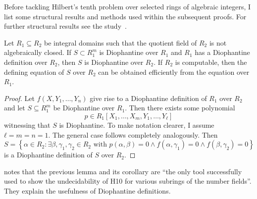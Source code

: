 %

Before tackling Hilbert's tenth problem over selected rings of algebraic
integers, I list some structural results and methods used within the subsequent
proofs. For further structural results see the study~\cite{Shlapentokh2000}.

\begin{lem}\label{lem:moving up}
Let \(R_1 \subseteq R_2\) be integral domains such that the quotient field of
\(R_2\) is not algebraically closed. If \(S ⊂ R_1^m\) is Diophantine over
\(R_1\) and \(R_1\) has a Diophantine definition over \(R_2\), then \(S\) is
Diophantine over \(R_2\). If \(R_2\) is computable, then the defining equation
of \(S\) over \(R_2\) can be obtained efficiently from the equation over
\(R_1\).
\end{lem}
\begin{proof}
  Let \(f(X, Y_1, …, Y_n)\) give rise to a Diophantine definition of \(R_1\)
  over \(R_2\) and let \(S \subseteq R_1^m\) be Diophantine over \(R_1\). Then
  there exists some polynomial
  \[
    p ∈ R_1[X_1, …, X_m, Y_1, …, Y_ℓ]
  \]
  witnessing that \(S\) is Diophantine. To make notation clearer, I assume \(ℓ =
  m = n = 1\). The general case follows completely analogously. Then
  \[
    S = \left\lbrace  α ∈ R_2 :
         ∃β, γ_1, γ_2 ∈ R_2 \text{ with }
            p(α, β) = 0 ∧ f(α, γ_1) = 0 ∧ f(β, γ_2) = 0\right\rbrace
  \]
  is a Diophantine definition of \(S\) over \(R_2\).
\end{proof}

\textcite{Shlapentokh2000} notes that the previous lemma and its corollary are
\enquote{the only tool successfully used to show the undecidability
of \textsc{H10} for various subrings of the number fields}. They explain the
usefulness of Diophantine definitions.

